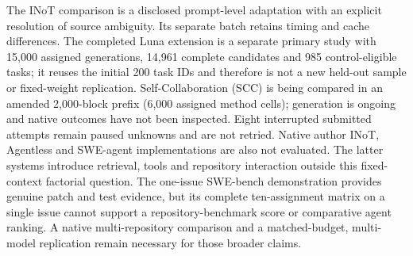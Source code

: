 The INoT comparison is a disclosed prompt-level adaptation with an explicit resolution of source ambiguity. Its separate batch retains timing and cache differences. The completed Luna extension is a separate primary study with 15,000 assigned generations, 14,961 complete candidates and 985 control-eligible tasks; it reuses the initial 200 task IDs and therefore is not a new held-out sample or fixed-weight replication. Self-Collaboration (SCC) is being compared in an amended 2,000-block prefix (6,000 assigned method cells); generation is ongoing and native outcomes have not been inspected. Eight interrupted submitted attempts remain paused unknowns and are not retried. Native author INoT, Agentless and SWE-agent implementations are also not evaluated. The latter systems introduce retrieval, tools and repository interaction outside this fixed-context factorial question. The one-issue SWE-bench demonstration provides genuine patch and test evidence, but its complete ten-assignment matrix on a single issue cannot support a repository-benchmark score or comparative agent ranking. A native multi-repository comparison and a matched-budget, multi-model replication remain necessary for those broader claims.
